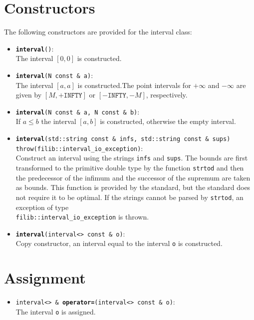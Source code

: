 \documentclass{report}
\begin{document}
	\section{Constructors}
		The following constructors are provided for the interval class:
		\begin{itemize}
		\item \texttt{{\bf interval}()}:\\ The interval $[0,0]$ is constructed.
		\item \texttt{{\bf interval}(N const \& a)}:\\  The interval
	$[a,a]$ is constructed.The point intervals for
			 $+\infty$ and $-\infty$ are given
	by 
			$[M,+\texttt{INFTY}]$ or $[-\texttt{INFTY},-M]$, respectively.


		\item \texttt{{\bf interval}(N const \& a, N const \& b)}:\\
			If $a \leq b$ the interval $[a,b]$ is
	constructed, otherwise the empty interval.

		\item \texttt{{\bf interval}(std::string const \& infs, std::string const \& sups) \\throw(filib::interval\_io\_exception)}:\\
			Construct an interval using the strings \texttt{infs}
and \texttt{sups}. The bounds are first transformed to the primitive
double type by the function \texttt{strtod} and then the predecessor of the infimum and
the successor of the supremum are taken as bounds. This function is provided by the standard, but
the standard does not require it to be optimal.  If the strings cannot be parsed
by \texttt{strtod}, an exception of type \\\texttt{filib::interval\_io\_exception}
is thrown.
	
		\item \texttt{{\bf interval}(interval<> const \& o)}:\\ Copy
			constructor, an interval equal to the interval
			\texttt{o} is constructed.
		\end{itemize}
	\section{Assignment}

		\begin{itemize}
		\item \texttt{interval<> \& {\bf operator=}(interval<> const \& o)}:\\
	The interval \texttt{o} is assigned.
		\end{itemize}
\end{document}

